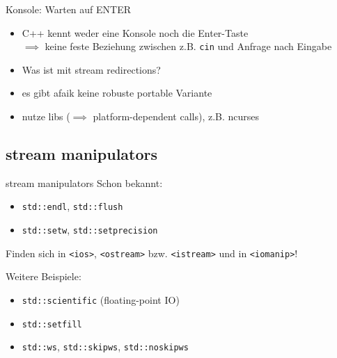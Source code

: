 \begin{frame}[fragile]{Konsole: Warten auf ENTER}
	\footnotesize
	\begin{itemize}
		\item C++ kennt weder eine Konsole noch die Enter-Taste	\\
			$\implies$ keine feste Beziehung zwischen z.B. \texttt{cin} und Anfrage nach Eingabe
		\item Was ist mit stream redirections?
		\item es gibt afaik keine robuste portable Variante
		\item nutze libs ($\implies$ platform-dependent calls), z.B. ncurses
	\end{itemize}
\end{frame}


\subsection{stream manipulators}

\begin{frame}{stream manipulators}
	Schon bekannt:
	\begin{itemize}
		\item \texttt{std::endl}, \texttt{std::flush}
		\item \texttt{std::setw}, \texttt{std::setprecision}
	\end{itemize}
	
	\vspace{1em}
	
	Finden sich in \texttt{<ios>}, \texttt{<ostream>} bzw. \texttt{<istream>} und in \texttt{<iomanip>}!
	
	\vspace{1em}
	
	Weitere Beispiele:
	\begin{itemize}
		\item \texttt{std::scientific} (floating-point IO)
		\item \texttt{std::setfill}
		\item \texttt{std::ws}, \texttt{std::skipws}, \texttt{std::noskipws}
	\end{itemize}
\end{frame}

